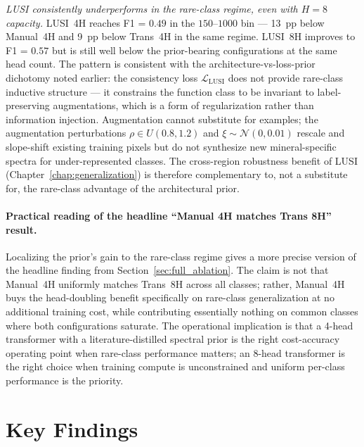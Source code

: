 \documentclass[11pt]{report}
\begin{document}
\emph{LUSI consistently underperforms in the rare-class regime, even with $H = 8$ capacity.}
LUSI~4H reaches F1 = $0.49$ in the $150$--$1000$ bin --- 13~pp below Manual~4H and 9~pp below Trans~4H in the same regime. LUSI~8H improves to F1 = $0.57$ but is still well below the prior-bearing configurations at the same head count. The pattern is consistent with the architecture-vs-loss-prior dichotomy noted earlier: the consistency loss $\mathcal{L}_{\text{LUSI}}$ does not provide rare-class inductive structure --- it constrains the function class to be invariant to label-preserving augmentations, which is a form of regularization rather than information injection. Augmentation cannot substitute for examples; the augmentation perturbations $\rho \in U(0.8, 1.2)$ and $\xi \sim \mathcal{N}(0, 0.01)$ rescale and slope-shift existing training pixels but do not synthesize new mineral-specific spectra for under-represented classes. The cross-region robustness benefit of LUSI (Chapter~\ref{chap:generalization}) is therefore complementary to, not a substitute for, the rare-class advantage of the architectural prior.

\paragraph{Practical reading of the headline ``Manual 4H matches Trans 8H'' result.}
Localizing the prior's gain to the rare-class regime gives a more precise version of the headline finding from Section~\ref{sec:full_ablation}. The claim is not that Manual~4H uniformly matches Trans~8H across all classes; rather, Manual~4H buys the head-doubling benefit specifically on rare-class generalization at no additional training cost, while contributing essentially nothing on common classes where both configurations saturate. The operational implication is that a 4-head transformer with a literature-distilled spectral prior is the right cost-accuracy operating point when rare-class performance matters; an 8-head transformer is the right choice when training compute is unconstrained and uniform per-class performance is the priority.

\section{Key Findings}
\end{document}
